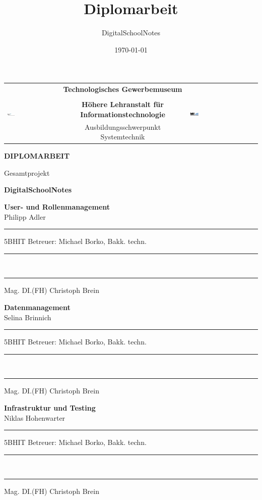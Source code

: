 \documentclass[12pt]{article}
\title{Diplomarbeit}
\author{DigitalSchoolNotes}
\date{\today}
\newcommand\blankpage{%
    \null
    \thispagestyle{empty}%
    \addtocounter{page}{-1}%
    \newpage}
\begin{document}
\afterpage{\blankpage}

\begin{titlepage}
\begin{center}

\setlength{\arrayrulewidth}{0.3mm}
\begin{table}[]
\centering
\begin{tabular}{lcl}
\multirow{4}{*}{
\includegraphics[width=0.15\textwidth]{images/tgm_logo}} & \textbf{\Large Technologisches Gewerbemuseum}                  & \multirow{4}{*}{\includegraphics[width=0.12\textwidth]{images/htl_logo}} \\
                           & &\\ & \textbf{Höhere Lehranstalt für Informationstechnologie} &                   \\
                           & Ausbildungsschwerpunkt Systemtechnik                    &                  \\\hline
\end{tabular}
\end{table}

\textbf{\LARGE DIPLOMARBEIT}

\vspace{5mm}

Gesamtprojekt

\textbf{\Large DigitalSchoolNotes}

\vspace{15mm}

\end{center}

\textbf{User- und Rollenmanagement}\\
Philipp Adler \rule[-0.2cm]{1.3cm}{0pt} 5BHIT \hfill Betreuer: Michael Borko, Bakk. techn. \rule[-0.2cm]{0.4cm}{0pt}\\
\rule[-0.2cm]{9.8cm}{0pt} Mag. DI.(FH) Christoph Brein

\textbf{Datenmanagement}\\
Selina Brinnich \rule[-0.2cm]{1cm}{0pt} 5BHIT \hfill Betreuer: Michael Borko, Bakk. techn. \rule[-0.2cm]{0.4cm}{0pt}\\
\rule[-0.2cm]{9.8cm}{0pt} Mag. DI.(FH) Christoph Brein

\textbf{Infrastruktur und Testing}\\
Niklas Hohenwarter \rule[-0.2cm]{0.2cm}{0pt} 5BHIT \hfill Betreuer: Michael Borko, Bakk. techn. \rule[-0.2cm]{0.4cm}{0pt}\\
\rule[-0.2cm]{9.8cm}{0pt} Mag. DI.(FH) Christoph Brein


\end{titlepage}
\end{document}

